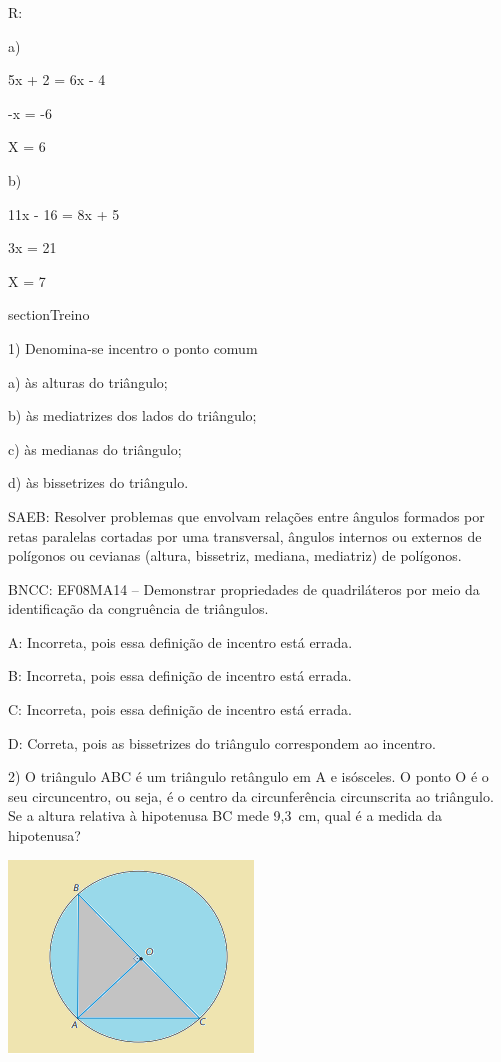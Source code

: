 R:

a)

5x + 2 = 6x - 4

-x = -6

X = 6

b)

11x - 16 = 8x + 5

3x = 21

X = 7

section{Treino}

1) Denomina-se incentro o ponto comum

a) às alturas do triângulo;

b) às mediatrizes dos lados do triângulo;

c) às medianas do triângulo;

d) às bissetrizes do triângulo.

SAEB: Resolver problemas que envolvam relações entre ângulos formados
por retas paralelas cortadas por uma transversal, ângulos internos ou
externos de polígonos ou cevianas (altura, bissetriz, mediana,
mediatriz) de polígonos.

BNCC: EF08MA14 -- Demonstrar propriedades de quadriláteros por meio da
identificação da congruência de triângulos.

A: Incorreta, pois essa definição de incentro está errada.

B: Incorreta, pois essa definição de incentro está errada.

C: Incorreta, pois essa definição de incentro está errada.

D: Correta, pois as bissetrizes do triângulo correspondem ao incentro.

2) O triângulo ABC é um triângulo retângulo em A e isósceles. O ponto O
é o seu circuncentro, ou seja, é o centro da circunferência circunscrita
ao triângulo. Se a altura relativa à hipotenusa BC mede 9,3~cm, qual é a
medida da hipotenusa?

\includegraphics[width=2.5625in,height=2.02083in]{./imgSAEB_8_MAT/media/image35.png}

